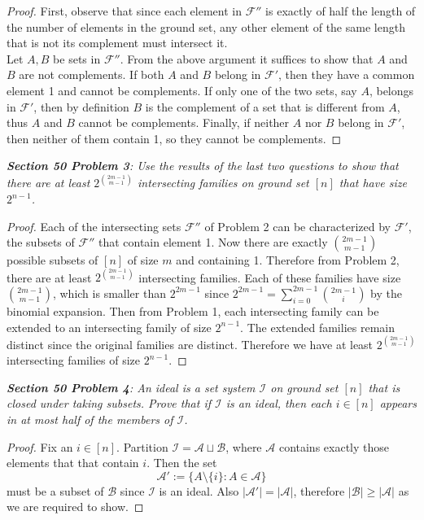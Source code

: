\documentclass{article}
\begin{document}
  \begin{proof}
    First, observe that since each element in $\mathcal{F}''$ is exactly of
    half the length of the number of elements in the ground set, any other
    element of the same length that is not its complement must intersect
    it. \\

    Let $A,B$ be sets in $\mathcal{F}''$. From the above argument it
    suffices to show that $A$ and $B$ are not complements. If both $A$ and
    $B$ belong in $\mathcal{F}'$, then they have a common element 1 and
    cannot be complements. If only one of the two sets, say $A$,
    belongs in $\mathcal{F}'$, then by definition $B$ is the complement of
    a set that is different from $A$, thus $A$ and $B$ cannot be
    complements. Finally, if neither $A$ nor $B$ belong in $\mathcal{F}'$,
    then neither of them contain 1, so they cannot be complements.
  \end{proof}

\it \textbf{Section 50 Problem 3}: Use the results of the last two
  questions to show that there are at least $2^{\binom{2m-1}{m-1}}$
  intersecting families on ground set $[n]$ that have size $2^{n-1}$.

  \begin{proof}
    Each of the intersecting sets $\mathcal{F}''$ of Problem 2 can be
    characterized by $\mathcal{F}'$, the subsets of $\mathcal{F}''$ that
    contain element 1. Now there are exactly $\binom{2m-1}{m-1}$ possible
    subsets of $[n]$ of size $m$ and containing 1. Therefore from Problem
    2, there are at least $2^{\binom{2m-1}{m-1}}$ intersecting families.
    Each of these families have size $\binom{2m-1}{m-1}$, which is smaller
    than $2^{2m-1}$ since $2^{2m-1}=\sum_{i=0}^{2m-1} \binom{2m-1}{i}$ by
    the binomial expansion. Then from Problem 1, each intersecting family
    can be extended to an intersecting family of size $2^{n-1}$. The
    extended families remain distinct since the original families are
    distinct. Therefore we have at least $2^{\binom{2m-1}{m-1}}$
    intersecting families of size $2^{n-1}$.
  \end{proof}

\it \textbf{Section 50 Problem 4}: An ideal is a set system $\mathcal{I}$
  on ground set $[n]$ that is closed under taking subsets. Prove that if
  $\mathcal{I}$ is an ideal, then each $i\in[n]$ appears in at most half of
  the members of $\mathcal{I}$.

  \begin{proof}
    Fix an $i\in[n]$. Partition $\mathcal{I}=\mathcal{A}\sqcup
    \mathcal{B}$, where $\mathcal{A}$ contains exactly those elements that
    that contain $i$. Then the set
    \[\mathcal{A}':=\{A\setminus\{i\}: A\in\mathcal{A}\}\]
    must be a subset of $\mathcal{B}$ since $\mathcal{I}$ is an ideal. Also
    $|\mathcal{A}'|=|\mathcal{A}|$, therefore
    $|\mathcal{B}|\geq|\mathcal{A}|$ as we are required to show.
  \end{proof}
\end{document}
